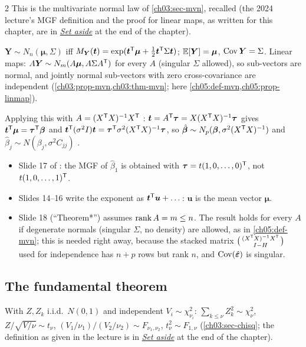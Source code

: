 \begin{paracol}{2}
This is the multivariate normal law of \cref{ch03:sec-mvn}, recalled \inmargin{} (the 2024 lecture's MGF definition and the proof for linear maps, as written for this chapter, are in \hyperref[ch05:sec-setaside]{\emph{Set aside}} at the end of the chapter).
\begin{recall}
$\bm Y\sim N_n(\bm\mu,\Sigma)$ iff $M_{\bm Y}(\bm t)=\exp(\bm t^{\mathsf T}\bm\mu+\frac12\bm t^{\mathsf T}\Sigma\bm t)$; $\mathbb{E}[\bm Y]=\bm\mu$, $\operatorname{Cov}\bm Y=\Sigma$.
Linear maps: $A\bm Y\sim N_m(A\bm\mu,A\Sigma A^{\mathsf T})$ for every $A$ (singular $\Sigma$ allowed), so sub-vectors are normal, and jointly normal sub-vectors with zero cross-covariance are independent (\cref{ch03:prop-mvn,ch03:thm-mvn}; here \cref{ch05:def-mvn,ch05:prop-linmap}).
\end{recall}
Applying this with $A=(X^{\mathsf T} X)^{-1}X^{\mathsf T}$ : $\bm t=A^{\mathsf T}\bm\tau=X(X^{\mathsf T} X)^{-1}\bm\tau$ gives $\bm t^{\mathsf T}\bm\mu=\bm\tau^{\mathsf T}\bm\beta$ and
$\bm t^{\mathsf T}(\sigma^2I)\bm t=\bm\tau^{\mathsf T}\sigma^2(X^{\mathsf T} X)^{-1}\bm\tau$, so $\hat{\bm\beta}\sim N_p(\bm\beta,\sigma^2(X^{\mathsf T} X)^{-1})$ and
$\hat\beta_j\sim N(\beta_j,\sigma^2C_{jj})$  .

\begin{coursenote}
\begin{itemize}
  \item Slide 17 of : the MGF of $\hat\beta_1$ is obtained with $\bm\tau=t(1,0,\dots,0)^{\mathsf T}$, not $t(1,0,\dots,1)^{\mathsf T}$.
  \item Slides 14--16 write the exponent as $\bm t^{\mathsf T}\bm u+\dots$: $\bm u$ is the mean vector $\bm\mu$.
  \item Slide 18 (``Theorem*'') assumes $\operatorname{rank} A=m\le n$. The result holds for every $A$ if degenerate normals
        (singular $\Sigma$, no density) are allowed, as in \cref{ch05:def-mvn}; this is needed right away, because the
        stacked matrix $\bigl(\begin{smallmatrix}(X^{\mathsf T} X)^{-1}X^{\mathsf T}\\ I-H\end{smallmatrix}\bigr)$ used for independence has $n+p$
        rows but rank $n$, and $\operatorname{Cov}(\hat{\bm\varepsilon})$ is singular.
\end{itemize}
\end{coursenote}

\subsection{The fundamental theorem}
\begin{recall}
With $Z,Z_k$ i.i.d.\ $N(0,1)$ and independent $V_i\sim\chi^2_{\nu_i}$: $\sum_{k\le\nu}Z_k^2\sim\chi^2_\nu$, $Z/\sqrt{V/\nu}\sim t_\nu$, $(V_1/\nu_1)/(V_2/\nu_2)\sim F_{\nu_1,\nu_2}$, $t_\nu^2\sim F_{1,\nu}$ (\cref{ch03:sec-chisq}; the definition as given in the lecture is in \hyperref[ch05:sec-setaside]{\emph{Set aside}} at the end of the chapter).
\end{recall}


\end{paracol}
